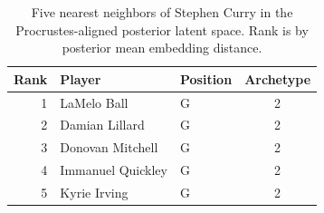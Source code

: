 \begin{table}[htbp]
  \centering\small
  \begin{tabular}{rllc}
    \toprule
    Rank & Player & Position & Archetype \\
    \midrule
    1 & LaMelo Ball & G & 2 \\
    2 & Damian Lillard & G & 2 \\
    3 & Donovan Mitchell & G & 2 \\
    4 & Immanuel Quickley & G & 2 \\
    5 & Kyrie Irving & G & 2 \\
    \bottomrule
  \end{tabular}
  \caption{Five nearest neighbors of Stephen Curry in the Procrustes-aligned posterior latent space. Rank is by posterior mean embedding distance.}
  \label{tab:Stephen_Curry_neighbors}
\end{table}

